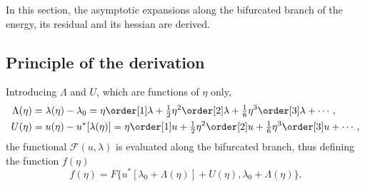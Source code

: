 In this section, the asymptotic expansions along the bifurcated branch of the energy, its residual and its hessian are
derived.

\subsection{Principle of the derivation}
\label{sec:20220107121442}
%

Introducing $\Lambda$ and $U$, which are functions of $\eta$ only,
\begin{align}
  \label{eq:20211112155446}
  \Lambda(\eta) & = \lambda(\eta) - \lambda_0 = \eta \order[1]\lambda + \tfrac{1}{2} \eta^2 \order[2]\lambda + \tfrac{1}{6} \eta^3 \order[3]\lambda + \cdots,\\
  \label{eq:20211112113028}
  U(\eta) & = u(\eta) - u^{\ast}[\lambda(\eta)] = \eta \order[1]u + \tfrac{1}{2} \eta^2 \order[2]u + \tfrac{1}{6} \eta^3 \order[3]u + \cdots,
\end{align}
the functional $\mathcal{F}(u, \lambda)$ is evaluated along the bifurcated branch, thus defining the function $f(\eta)$
\begin{equation*}
  f(\eta) = F\{ u^{\ast} [\lambda_0 + \Lambda(\eta)] + U(\eta), \lambda_0 + \Lambda(\eta) \}.
\end{equation*}

